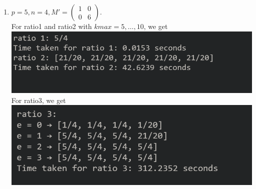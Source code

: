 \documentclass[letterpaper,12pt]{article}
\begin{document}
\begin{enumerate}
\item $p=5, n=4, M' = \begin{pmatrix}
1 & 0 \\ 0 & 6
\end{pmatrix}.$ \\
For ratio1 and ratio2 with $kmax = 5, \dots, 10$, we get \\
\includegraphics[scale=0.5]{ex8_1.png} \\
For ratio3, we get \\
\includegraphics[scale=0.5]{ex8_2.png}

\end{enumerate}

\end{document}
